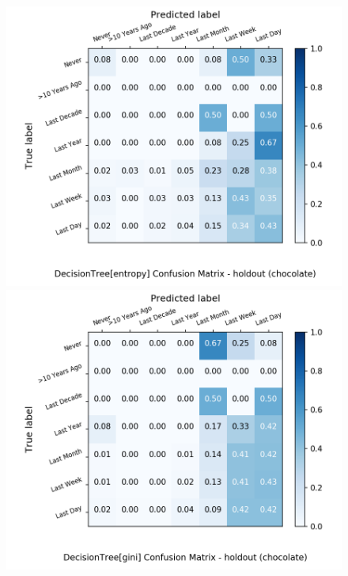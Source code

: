 \begin{figure}[H]
	\centering
	\begin{minipage}[b]{0.32\textwidth}
		\includegraphics[width=1.1\textwidth]{Plots/chocolate_DecisionTree_entropy_balance_False_holdout.png}
	\end{minipage}
	\begin{minipage}[b]{0.32\textwidth}
		\includegraphics[width=1.1\textwidth]{Plots/chocolate_DecisionTree_gini_balance_False_holdout.png}
	\end{minipage}
	\begin{minipage}[b]{0.32\textwidth}

\end{minipage}
\end{figure}
